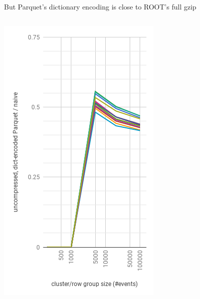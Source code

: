 \documentclass[aspectratio=169]{beamer}
\begin{document}
\begin{frame}{But Parquet's dictionary encoding is close to ROOT's full gzip}
\begin{columns}
\begin{center}
\includegraphics[width=\linewidth]{parquet-dict.png}
\end{center}
\end{columns}
\end{frame}
\end{document}
